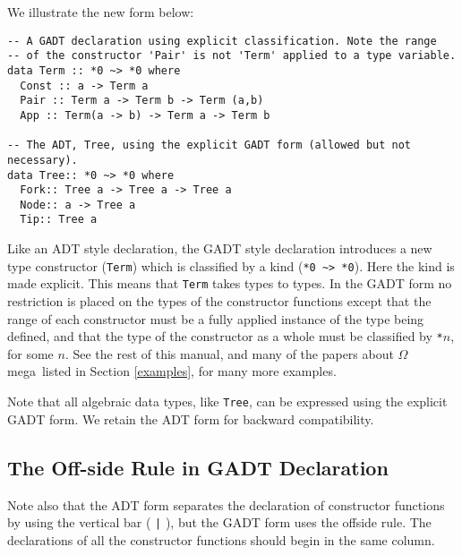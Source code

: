 \documentclass[11pt,twoside]{article}
\newcommand{\om}{$\Omega$mega}
\begin{document}
\noindent
We illustrate the new form below:

\begin{verbatim}
-- A GADT declaration using explicit classification. Note the range
-- of the constructor 'Pair' is not 'Term' applied to a type variable.
data Term :: *0 ~> *0 where
  Const :: a -> Term a
  Pair :: Term a -> Term b -> Term (a,b)
  App :: Term(a -> b) -> Term a -> Term b

-- The ADT, Tree, using the explicit GADT form (allowed but not necessary).
data Tree:: *0 ~> *0 where
  Fork:: Tree a -> Tree a -> Tree a
  Node:: a -> Tree a
  Tip:: Tree a
\end{verbatim}

Like an ADT style declaration, the GADT style declaration introduces a new
type constructor ({\tt Term}) which is classified by a kind (\verb+*0 ~> *0+). Here
the kind is made explicit. This means that {\tt Term} takes types to types.
In the GADT form no restriction is placed on the types of the constructor
functions except that the range of each constructor must be a fully applied
instance of the type being defined, and that the type of the constructor as
a whole must be classified by \verb+*+$n$, for some $n$. See the rest of this
manual, and many of the papers about \om\
listed in Section \ref{examples}, for many more examples.

Note that all algebraic data types, like {\tt Tree}, can be expressed using
the explicit GADT form. We retain the ADT form for backward compatibility.

\subsection{The Off-side Rule in GADT Declaration}
Note also that the ADT form separates the declaration of constructor
functions by using the vertical bar ( \verb+|+ ), but the GADT form uses
the offside rule. The declarations of all the constructor functions should
begin in the same column.
\end{document}
